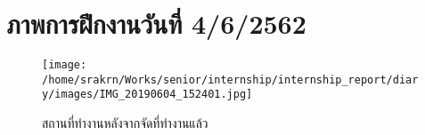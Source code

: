 
\section*{ภาพการฝึกงานวันที่ 4/6/2562}
\begin{figure}[h]
    \centering
    \texttt{[image: /home/srakrn/Works/senior/internship/internship\_report/diary/images/IMG\_20190604\_152401.jpg]}
    \caption{สถานที่ทำงานหลังจากจัดที่ทำงานแล้ว}
\end{figure}
